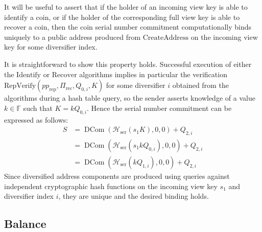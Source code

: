 \documentclass{llncs}
\newcommand{\F}{\mathbb{F}}
\newcommand{\hash}{\mathcal{H}}
\newcommand{\dcom}{\operatorname{DCom}}
\begin{document}
\begin{remark}
It will be useful to assert that if the holder of an incoming view key is able to identify a coin, or if the holder of the corresponding full view key is able to recover a coin, then the coin serial number commitment computationally binds uniquely to a public address produced from $\text{CreateAddress}$ on the incoming view key for some diversifier index.

It is straightforward to show this property holds.
Successful execution of either the $\text{Identify}$ or $\text{Recover}$ algorithms implies in particular the verification $\text{RepVerify}(pp_{\text{rep}},\Pi_{\text{rec}},Q_{0,i},K)$ for some diversifier $i$ obtained from the algorithms during a hash table query, so the sender asserts knowledge of a value $k \in \F$ such that $K = kQ_{0,i}$.
Hence the serial number commitment can be expressed as follows:
\begin{align*}
S &= \dcom(\hash_{\text{ser}}(s_1 K), 0, 0) + Q_{2,i} \\
&= \dcom(\hash_{\text{ser}}(s_1 kQ_{0,i}), 0, 0) + Q_{2,i} \\
&= \dcom(\hash_{\text{ser}}(kQ_{1,i}), 0, 0) + Q_{2,i}
\end{align*}
Since diversified address components are produced using queries against independent cryptographic hash functions on the incoming view key $s_1$ and diversifier index $i$, they are unique and the desired binding holds.
\end{remark}


\subsection{Balance}
\end{document}
